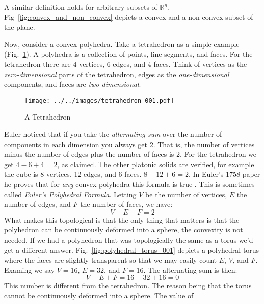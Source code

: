     A similar definition holds for arbitrary subsets of $\mathbb{R}^{n}$.
    Fig~\ref{fig:convex_and_non_convex} depicts a convex and a non-convex
    subset of the plane.
    \par\hfill\par
    Now, consider a convex polyhedra. Take a tetrahedron as a simple
    example (Fig.~\ref{fig:tetrahedron_001}). A polyhedra is a collection of
    points, line segments, and faces. For the tetrahedron there are 4 vertices,
    6 edges, and 4 faces. Think of vertices as the
    \textit{zero-dimensional} parts of the tetrahedron, edges as the
    \textit{one-dimensional} components, and faces are \textit{two-dimensional}.
    \begin{figure}[H]
        \centering
        \texttt{[image: ../../images/tetrahedron\_001.pdf]}
        \caption{A Tetrahedron}
        \label{fig:tetrahedron_001}
    \end{figure}
    Euler noticed that if you take the \textit{alternating sum} over the number
    of components in each dimension you always get 2. That is, the number of
    vertices minus the number of edges plus the number of faces is 2. For the
    tetrahedron we get $4-6+4=2$, as claimed. The other platonic solids are
    verified, for example the cube is 8 vertices, 12 edges, and 6 faces.
    $8-12+6=2$. In Euler's 1758 paper he proves that for \textit{any} convex
    polyhedra this formula is true \cite{LeonhardEulerPolyhedraFormula}. This
    is sometimes called \textit{Euler's Polyhedral Formula}. Letting $V$ be the
    number of vertices, $E$ the number of edges, and $F$ the number of faces,
    we have:
    \begin{equation}
        V-E+F=2
    \end{equation}
    What makes this topological is that the only thing that matters is that the
    polyhedron can be continuously deformed into a sphere, the convexity is not
    needed. If we had a polyhedron that was topologically the same as a torus
    we'd get a different answer.
    Fig.~\ref{fig:polyhedral_torus_001} depicts a polyhedral torus where the
    faces are slightly transparent so that we may easily count $E$, $V$, and
    $F$. Examing we say $V=16$, $E=32$, and $F=16$. The alternating sum is
    then:
    \begin{equation}
        V-E+F=16-32+16=0
    \end{equation}
    This number is different from the tetrahedron. The reason being that the
    torus cannot be continuously deformed into a sphere. The value of
